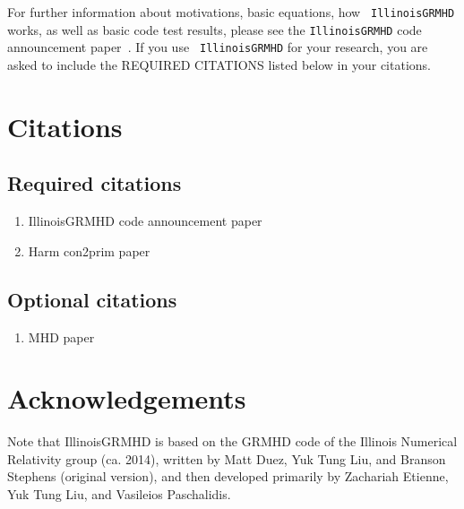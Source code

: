 \documentclass{article}
\begin{document}
For further information about motivations, basic equations, how {\tt
  IllinoisGRMHD} works, as well as basic code test results, please see
the {\tt IllinoisGRMHD} code announcement
paper~\cite{WVUThorns_IllinoisGRMHD_Etienne:2015cea}. If you use {\tt
  IllinoisGRMHD} for your research, you are asked to include the
REQUIRED CITATIONS listed below in your citations.

\section{Citations}
\subsection{Required citations}
\begin{enumerate}
\item IllinoisGRMHD code announcement paper~\cite{WVUThorns_IllinoisGRMHD_Etienne:2015cea}
\item Harm con2prim paper~\cite{WVUThorns_IllinoisGRMHD_Noble:2005gf}
\end{enumerate}

\subsection{Optional citations}
\begin{enumerate}
\item MHD paper~\cite{WVUThorns_IllinoisGRMHD_DelZanna:2002rv}
\end{enumerate}

\section{Acknowledgements}

Note that IllinoisGRMHD
is based on the GRMHD code of the Illinois Numerical Relativity
group (ca. 2014), written by Matt Duez, Yuk Tung Liu, and Branson
Stephens (original version), and then developed primarily by
Zachariah Etienne, Yuk Tung Liu, and Vasileios Paschalidis.
\end{document}
